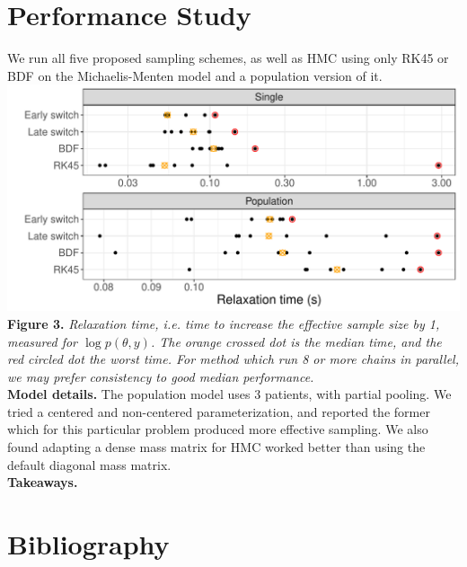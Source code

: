 \documentclass[21pt, custom, portrait, plainboxedsections]{sciposter}
\begin{document}
\begin{multicols}{3}
\columnbreak

\section*{Performance Study}

We run all five proposed sampling schemes, as well as HMC using only RK45 or BDF on the Michaelis-Menten model and a population version of it. \\

\includegraphics[width = 12in]{../figures/performance.pdf} \\
\textbf{Figure 3.} \textit{Relaxation time, i.e. time to increase the effective sample size by 1, measured for $\log p(\theta, y)$. The orange crossed dot is the median time, and the red circled dot the worst time.
For method which run 8 or more chains in parallel,  we may prefer consistency to good median performance.} \\

\textbf{Model details.} The population model uses 3 patients, with partial pooling. 
We tried a centered and non-centered parameterization, and reported the former which for this particular problem produced more effective sampling.
We also found adapting a dense mass matrix for HMC worked better than using the default diagonal mass matrix. \\

\textbf{Takeaways.} 

\section*{Bibliography}

{\footnotesize


}

\end{multicols}
\end{document}
